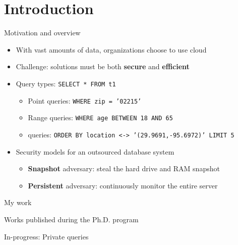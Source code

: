 \section{Introduction}

	\begin{frame}{Motivation and overview}

		\begin{itemize}
			\item<1-> With vast amounts of data, organizations choose to use cloud
			\item<1-> \alert{Challenge:} solutions must be both \textbf{secure} and \textbf{efficient}
			\item<2-> Query types: \texttt{SELECT * FROM t1 }
				\begin{itemize}
					\item<1,2,5-> Point queries: \texttt{WHERE zip = '02215'}
					\item<1,3,5-> Range queries: \texttt{WHERE age BETWEEN 18 AND 65}
					\item<1,4,5-> \knn{} queries: \texttt{ORDER BY location <-> '(29.9691,-95.6972)' LIMIT 5} %
				\end{itemize}
			\item<5-> Security models for an outsourced database system
				\begin{itemize}
					\item<1-4,5> \textbf{Snapshot} adversary: steal the hard drive and RAM snapshot %
					\item<1-4,6> \textbf{Persistent} adversary: continuously monitor the entire server %
				\end{itemize}
		\end{itemize}

	\end{frame}

	\newlength{\citationLength}

	\begin{frame}{My work}

		\begin{block}{Works published during the Ph.D. program}

			\vspace*{1ex}

			\begin{description}[
				leftmargin=\dimexpr\citationLength+0.5em\relax,
				labelindent=0pt,
				labelwidth=\citationLength%
			]
				\setlength\itemsep{1ex}
				\item<1>[\cite{ore-benchmark-17}] 
				\item<2>[\cite{epsolute}] 
				\item<3>[TBA] In-progress: Private \knn{} queries
				\item<4>[\cite{bogatov-idemix-2020}] 
			\end{description}

		\end{block}

	\end{frame}
